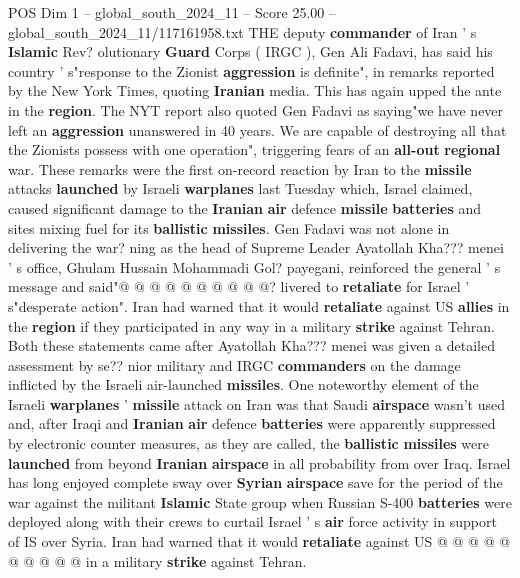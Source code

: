 \begin{textsample}{POS Dim 1 – global\_south\_2024\_11 – Score 25.00 – global\_south\_2024\_11/117161958.txt}  \label{ex:f1_pos_171}
THE deputy \textbf{commander} of Iran ' s \textbf{Islamic} Rev? olutionary \textbf{Guard} Corps ( IRGC ), Gen Ali Fadavi, has said his country ' s"response to the Zionist \textbf{aggression} is definite", in remarks reported by the New York Times, quoting \textbf{Iranian} media.
This has again upped the ante in the \textbf{region}.
The NYT report also quoted Gen Fadavi as saying"we have never left an \textbf{aggression} unanswered in 40 years.
We are capable of destroying all that the Zionists possess with one operation", triggering fears of an \textbf{all-out} \textbf{regional} war.
These remarks were the first on-record reaction by Iran to the \textbf{missile} attacks \textbf{launched} by Israeli \textbf{warplanes} last Tuesday which, Israel claimed, caused significant damage to the \textbf{Iranian} \textbf{air} defence \textbf{missile} \textbf{batteries} and sites mixing fuel for its \textbf{ballistic} \textbf{missiles}.
Gen Fadavi was not alone in delivering the war? ning as the head of Supreme Leader Ayatollah Kha??? menei ' s office, Ghulam Hussain Mohammadi Gol? payegani, reinforced the general ' s message and said"@ @ @ @ @ @ @ @ @ @? livered to \textbf{retaliate} for Israel ' s"desperate action".
Iran had warned that it would \textbf{retaliate} against US \textbf{allies} in the \textbf{region} if they participated in any way in a military \textbf{strike} against Tehran.
Both these statements came after Ayatollah Kha??? menei was given a detailed assessment by se?? nior military and IRGC \textbf{commanders} on the damage inflicted by the Israeli air-launched \textbf{missiles}.
One noteworthy element of the Israeli \textbf{warplanes} ' \textbf{missile} attack on Iran was that Saudi \textbf{airspace} wasn't used and, after Iraqi and \textbf{Iranian} \textbf{air} defence \textbf{batteries} were apparently suppressed by electronic counter measures, as they are called, the \textbf{ballistic} \textbf{missiles} were \textbf{launched} from beyond \textbf{Iranian} \textbf{airspace} in all probability from over Iraq.
Israel has long enjoyed complete sway over \textbf{Syrian} \textbf{airspace} save for the period of the war against the militant \textbf{Islamic} State group when Russian S-400 \textbf{batteries} were deployed along with their crews to curtail Israel ' s \textbf{air} force activity in support of IS over Syria.
Iran had warned that it would \textbf{retaliate} against US @ @ @ @ @ @ @ @ @ @ in a military \textbf{strike} against Tehran.

\end{textsample}
